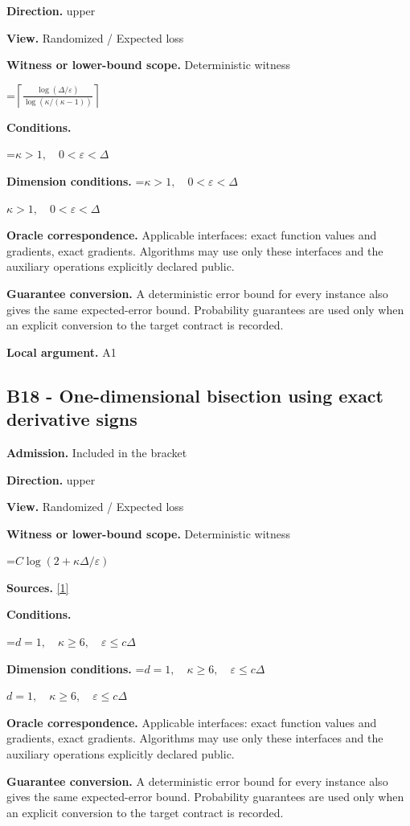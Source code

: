 \documentclass[10pt,a4paper]{article}
\newcommand{\AtlasMath}[1]{\par\begingroup\centering\setbox0=\hbox{$\displaystyle #1$}\ifdim\wd0>1.4\linewidth\typeout{ATLAS WIDE FORMULA: \the\wd0}\fi\ifdim\wd0>\linewidth\resizebox{\linewidth}{!}{\box0}\else\box0\fi\par\endgroup}
\newcommand{\AtlasInlineMath}[1]{\begingroup\setbox0=\hbox{$#1$}\ifdim\wd0>.4\linewidth\endgroup\AtlasMath{#1}\else\endgroup$#1$\fi}
\begin{document}
\textbf{Direction.} upper

\textbf{View.} Randomized / Expected loss

\textbf{Witness or lower-bound scope.} Deterministic witness

\AtlasMath{\left\lceil\frac{\log(\Delta/\varepsilon)}{\log(\kappa/(\kappa-1))}\right\rceil}
\textbf{Conditions.} 
\AtlasMath{\kappa>1,\quad0<\varepsilon<\Delta}


\textbf{Dimension conditions.} \AtlasInlineMath{\kappa>1,\quad0<\varepsilon<\Delta}

\textbf{Oracle correspondence.} Applicable interfaces: exact function values and gradients, exact gradients. Algorithms may use only these interfaces and the auxiliary operations explicitly declared public.

\textbf{Guarantee conversion.} A deterministic error bound for every instance also gives the same expected-error bound. Probability guarantees are used only when an explicit conversion to the target contract is recorded.

\textbf{Local argument.} A1

\subsection{B18 - One-dimensional bisection using exact derivative signs}
\textbf{Admission.} Included in the bracket

\textbf{Direction.} upper

\textbf{View.} Randomized / Expected loss

\textbf{Witness or lower-bound scope.} Deterministic witness

\AtlasMath{C\log(2+\kappa\Delta/\varepsilon)}
\textbf{Sources.} \href{https://arxiv.org/pdf/2609.03990}{[1]}

\textbf{Conditions.} 
\AtlasMath{d=1,\quad\kappa\ge6,\quad\varepsilon\le c\Delta}


\textbf{Dimension conditions.} \AtlasInlineMath{d=1,\quad\kappa\ge6,\quad\varepsilon\le c\Delta}

\textbf{Oracle correspondence.} Applicable interfaces: exact function values and gradients, exact gradients. Algorithms may use only these interfaces and the auxiliary operations explicitly declared public.

\textbf{Guarantee conversion.} A deterministic error bound for every instance also gives the same expected-error bound. Probability guarantees are used only when an explicit conversion to the target contract is recorded.
\end{document}
